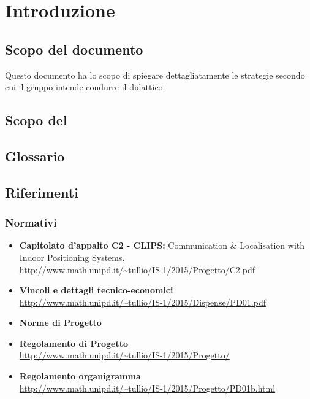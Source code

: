 \section{Introduzione}
	\subsection{Scopo del documento} 
	Questo documento ha lo scopo di spiegare dettagliatamente le strategie secondo cui il gruppo \AUTORE{} intende condurre il  didattico. 
	\subsection{Scopo del }
	\SCOPO
	\subsection{Glossario}
	\GLOSSARIO
	\subsection{Riferimenti}
		\subsubsection{Normativi}
			\begin{itemize}
				\item \textbf{Capitolato d'appalto C2 - CLIPS:} Communication \& Localisation with Indoor Positioning Systems. \\
				\url{http://www.math.unipd.it/~tullio/IS-1/2015/Progetto/C2.pdf}
				\item \textbf{Vincoli e dettagli tecnico-economici} \\
				\url{http://www.math.unipd.it/~tullio/IS-1/2015/Dispense/PD01.pdf}
				\item \textbf{Norme di Progetto} \\ \NPfile
				\item \textbf{Regolamento di Progetto} \\
				\url{http://www.math.unipd.it/~tullio/IS-1/2015/Progetto/}
				\item \textbf{Regolamento organigramma} \\
				\url{http://www.math.unipd.it/~tullio/IS-1/2015/Progetto/PD01b.html}
			\end{itemize}	
			

